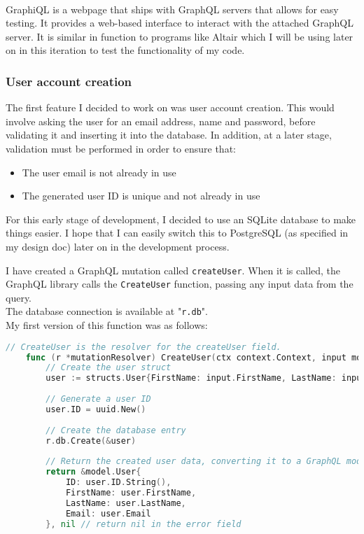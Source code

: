 \documentclass[../../main.tex]{subfiles}
\begin{document}
\noindent \\ GraphiQL is a webpage that ships with GraphQL servers that allows for easy testing. It provides a web-based interface to interact with the attached GraphQL server. It is similar in function to programs like Altair which I will be using later on in this iteration to test the functionality of my code.

\subsubsection{User account creation}

The first feature I decided to work on was user account creation. This would involve asking the user for an email address, name and password, before validating it and inserting it into the database.
In addition, at a later stage, validation must be performed in order to ensure that:

\begin{itemize}
    \item The user email is not already in use
    \item The generated user ID is unique and not already in use
\end{itemize}

\noindent For this early stage of development, I decided to use an SQLite database to make things easier. I hope that I can easily switch this to PostgreSQL (as specified in my design doc) later on in the development process.

\noindent I have created a GraphQL mutation called \lstinline{createUser}. When it is called, the GraphQL library calls the \lstinline{CreateUser} function, passing any input data from the query.\\ The database connection is available at "\lstinline{r.db}".\\

\noindent My first version of this function was as follows:

\begin{lstlisting}[language=Go]
    // CreateUser is the resolver for the createUser field.
    func (r *mutationResolver) CreateUser(ctx context.Context, input model.NewUser) (*model.User, error) {
        // Create the user struct
        user := structs.User{FirstName: input.FirstName, LastName: input.LastName, Email: input.Email}
        
        // Generate a user ID
        user.ID = uuid.New()
    
        // Create the database entry
        r.db.Create(&user)
    
        // Return the created user data, converting it to a GraphQL model.
        return &model.User{
            ID: user.ID.String(),
            FirstName: user.FirstName,
            LastName: user.LastName,
            Email: user.Email
        }, nil // return nil in the error field
    \end{lstlisting}
\end{document}
